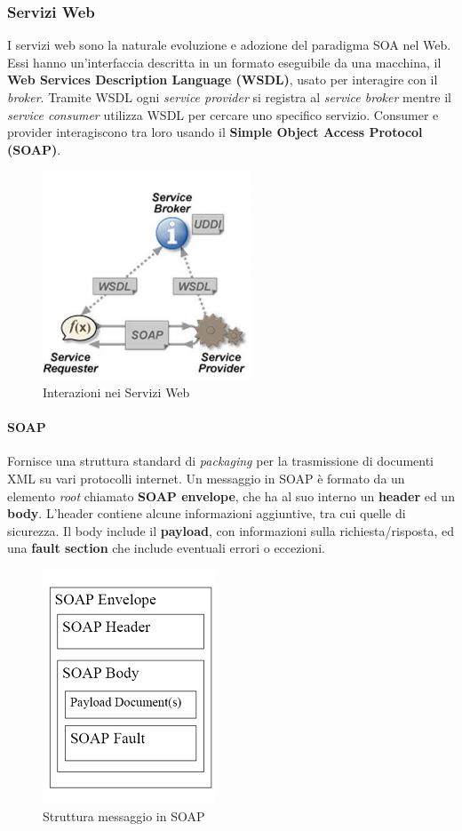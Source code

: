 \documentclass{article}
\begin{document}
\subsubsection{Servizi Web}
I servizi web sono la naturale evoluzione e adozione del paradigma SOA nel Web. Essi hanno un'interfaccia descritta in un formato eseguibile da una macchina, il \textbf{Web Services Description Language (WSDL)}, usato per interagire con il \textit{broker}. Tramite WSDL ogni \textit{service provider} si registra al \textit{service broker} mentre il \textit{service consumer} utilizza WSDL per cercare uno specifico servizio.
Consumer e provider interagiscono tra loro usando il \textbf{Simple Object Access Protocol (SOAP)}.
\begin{figure}[H]
\centering
\includegraphics{img/wsdl.png}
\caption{Interazioni nei Servizi Web}
\end{figure}

\paragraph{SOAP}
Fornisce una struttura standard di \textit{packaging} per la trasmissione di documenti XML su vari protocolli internet. Un messaggio in SOAP è formato da un elemento \textit{root} chiamato \textbf{SOAP envelope}, che ha al suo interno un \textbf{header} ed un \textbf{body}. L'header contiene alcune informazioni aggiuntive, tra cui quelle di sicurezza. Il body include il \textbf{payload}, con informazioni sulla richiesta/risposta, ed una \textbf{fault section} che include eventuali errori o eccezioni.
\begin{figure}[H]
\centering
\includegraphics[scale=0.7]{img/schemasoap.png}
\caption{Struttura messaggio in SOAP}
\end{figure}
\end{document}
